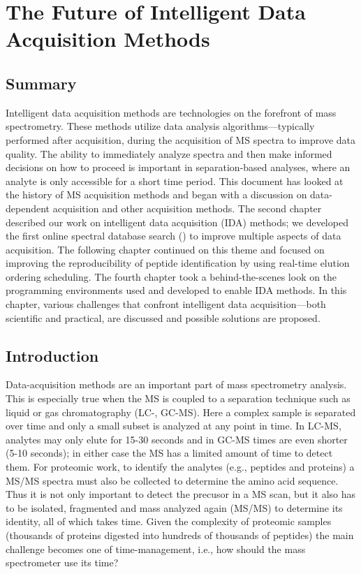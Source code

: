\chapter{The Future of Intelligent Data Acquisition Methods}

\section{Summary}
Intelligent data acquisition methods are technologies on the forefront of mass spectrometry. These methods utilize data analysis algorithms---typically performed after acquisition, during the acquisition of MS spectra to improve data quality. The ability to immediately analyze spectra and then make informed decisions on how to proceed is important in separation-based analyses, where an analyte is only accessible for a short time period. This document has looked at the history of MS acquisition methods and began with a discussion on data-dependent acquisition and other acquisition methods. The second chapter described our work on intelligent data acquisition (IDA) methods; we developed the first online spectral database search (\inseq{}) to improve multiple aspects of data acquisition. The following chapter continued on this theme and focused on improving the reproducibility of peptide identification by using real-time elution ordering scheduling. The fourth chapter took a behind-the-scenes look on the programming environments used and developed to enable IDA methods. In this chapter, various challenges that confront intelligent data acquisition---both scientific and practical, are discussed and possible solutions are proposed.

\section{Introduction}
Data-acquisition methods are an important part of mass spectrometry analysis. This is especially true when the MS is coupled to a separation technique such as liquid or gas chromatography (LC-, GC-MS). Here a complex sample is separated over time and only a small subset is analyzed at any point in time. In LC-MS, analytes may only elute for 15-30 seconds and in GC-MS times are even shorter (5-10 seconds); in either case the MS has a limited amount of time to detect them. For proteomic work, to identify the analytes (e.g., peptides and proteins) a MS/MS spectra must also be collected to determine the amino acid sequence. Thus it is not only important to detect the precusor in a MS scan, but it also has to be isolated, fragmented and mass analyzed again (MS/MS) to determine its identity, all of which takes time. Given the complexity of proteomic samples (thousands of proteins digested into hundreds of thousands of peptides) the main challenge becomes one of time-management, i.e., how should the mass spectrometer use its time?

